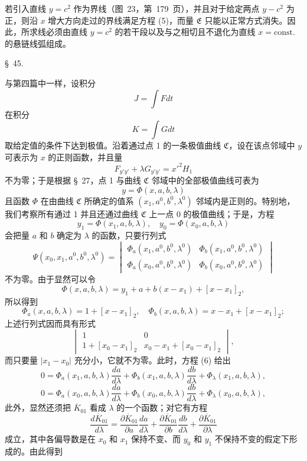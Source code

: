 \documentclass[11pt,a4paper,leqno]{article}
\begin{document}
若引入直线 $y=c^2$ 作为界线（图~23，第~179~页），并且对于给定两点 $y-c^2$ 为正，则沿 $x$ 增大方向走过的界线满足方程 (5)，而量 $\mathfrak{E}$ 只能以正常方式消失。因此，所求线必须由直线 $y=c^2$ 的若干段以及与之相切且不退化为直线 $x=\mathrm{const.}$ 的悬链线弧组成。

\begin{center}
{\large \S~45.}
\end{center}

与第四篇中一样，设积分
\[
J=\int Fdt
\]
在积分
\[
K=\int Gdt
\]
取给定值的条件下达到极值。沿着通过点 1 的一条极值曲线 $\mathfrak{C}$，设在该点邻域中 $y$ 可表示为 $x$ 的正则函数，并且量
\[
F_{y'y'}+\lambda G_{y'y'}=x'^2H_1
\]
不为零；于是根据 \S~27，点 1 与曲线 $\mathfrak{C}$ 邻域中的全部极值曲线可表为
\[
y=\Phi(x,a,b,\lambda)
\]
且函数 $\Phi$ 在由曲线 $\mathfrak{C}$ 所确定的值系 $(x_1,a^0,b^0,\lambda^0)$ 邻域内是正则的。特别地，我们考察所有通过 1 并且还通过曲线 $\mathfrak{C}$ 上一点 0 的极值曲线；于是，方程
\begin{equation}\tag{6}
y_1=\Phi(x_1,a,b,\lambda),\quad y_0=\Phi(x_0,a,b,\lambda)
\end{equation}
会把量 $a$ 和 $b$ 确定为 $\lambda$ 的函数，只要行列式
\[
\Psi(x_0,x_1,a^0,b^0,\lambda^0)=
\begin{vmatrix}
\Phi_a(x_1,a^0,b^0,\lambda^0)&\Phi_b(x_1,a^0,b^0,\lambda^0)\\
\Phi_a(x_0,a^0,b^0,\lambda^0)&\Phi_b(x_0,a^0,b^0,\lambda^0)
\end{vmatrix}
\]
不为零。由于显然可以令
\[
\Phi(x,a,b,\lambda)=y_1+a+b(x-x_1)+[x-x_1]_2,
\]
所以得到
\[
\Phi_a(x,a,b,\lambda)=1+[x-x_1]_2,
\quad
\Phi_b(x,a,b,\lambda)=x-x_1+[x-x_1]_2;
\]
上述行列式因而具有形式
\[
\begin{vmatrix}
1&0\\
1+[x_0-x_1]_2&x_0-x_1+[x_0-x_1]_2
\end{vmatrix},
\]
而只要量 $|x_1-x_0|$ 充分小，它就不为零。此时，方程 (6) 给出
\[
0=\Phi_a(x_1,a,b,\lambda)\frac{da}{d\lambda}
+\Phi_b(x_1,a,b,\lambda)\frac{db}{d\lambda}
+\Phi_\lambda(x_1,a,b,\lambda),
\]
\[
0=\Phi_a(x_0,a,b,\lambda)\frac{da}{d\lambda}
+\Phi_b(x_0,a,b,\lambda)\frac{db}{d\lambda}
+\Phi_\lambda(x_0,a,b,\lambda),
\]
此外，显然还须把 $\overline{K}_{01}$ 看成 $\lambda$ 的一个函数；对它有方程
\[
\frac{d\overline{K}_{01}}{d\lambda}
=\frac{\partial\overline{K}_{01}}{\partial a}\frac{da}{d\lambda}
+\frac{\partial\overline{K}_{01}}{\partial b}\frac{db}{d\lambda}
+\frac{\partial\overline{K}_{01}}{\partial\lambda}
\]
成立，其中各偏导数是在 $x_0$ 和 $x_1$ 保持不变、而 $y_0$ 和 $y_1$ 不保持不变的假定下形成的。由此得到
\end{document}
